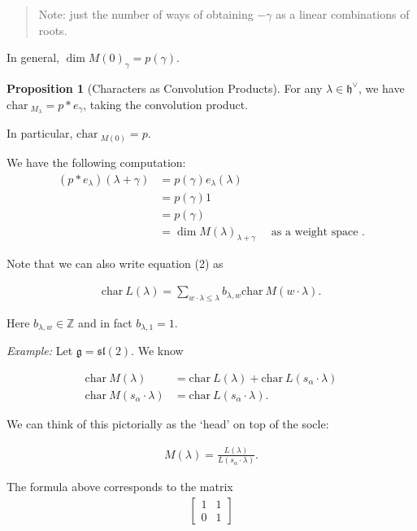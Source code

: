 \documentclass[11pt]{scrartcl}
\theoremstyle{definition}
\theoremstyle{theorem}
\newtheorem{proposition}[theorem]{Proposition}
\theoremstyle{proof}
\newenvironment{proof}
{\pushQED{$\qed$}\pf}
{\par\popQED\endpf}
\theoremstyle{definition}
\theoremstyle{break}
\theoremstyle{problem}
\newcommand{\ZZ}[0]{{\mathbb{Z}}}
\newcommand{\ch}[0]{\mathrm{char}~}
\newcommand{\dual}[0]{^\vee}
\newcommand{\lieg}[0]{{\mathfrak{g}}}
\newcommand{\lieh}[0]{{\mathfrak{h}}}
\newcommand{\liesl}[0]{{\mathfrak{sl}}}
\renewcommand{\qed}[0]{\hfill\blacksquare}
\begin{document}
\begin{quote}
Note: just the number of ways of obtaining \(-\gamma\) as a linear
combinations of roots.
\end{quote}

In general, \(\dim M(0)_\gamma = p(\gamma)\).

\begin{proposition}[Characters as Convolution Products]

For any \(\lambda \in \lieh\dual\), we have
\(\ch_{M_\lambda} = p\ast e_\gamma\), taking the convolution
product.\end{proposition}

In particular, \(\ch_{M(0)} = p\).

\begin{proof}[of Proposition]

We have the following computation: \begin{align*}
(p\ast e_\lambda)(\lambda+\gamma)
&= p(\gamma) e_\lambda(\lambda) \\
&= p(\gamma) 1 \\
&= p(\gamma) \\
&= \dim M(\lambda)_{\lambda + \gamma} \quad\text{ as a weight space }
.\end{align*}\end{proof}

Note that we can also write equation (2) as

\begin{align*}
\ch L(\lambda) = \sum_{w\cdot \lambda \leq \lambda} b_{\lambda, w} \ch M(w\cdot \lambda)
.\end{align*}

Here \(b_{\lambda, w} \in \ZZ\) and in fact \(b_{\lambda, 1} = 1\).

\emph{Example:} Let \(\lieg = \liesl(2)\). We know

\begin{align*}
\ch M(\lambda) &= \ch L(\lambda) + \ch L(s_\alpha \cdot \lambda) \\
\ch M(s_\alpha \cdot \lambda) &= \ch L(s_\alpha \cdot \lambda)
.\end{align*}

We can think of this pictorially as the `head' on top of the socle:

\begin{align*}
M(\lambda) = \frac{L(\lambda)}{L(s_\alpha \cdot \lambda)}
.\end{align*}

The formula above corresponds to the matrix
\begin{align*}
\left[\begin{array}{cc} 1 & 1 \\ 0 & 1 \end{array}\right]
\end{align*}
\end{document}
